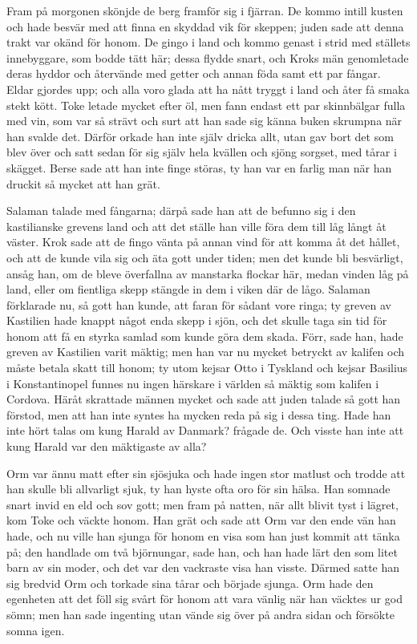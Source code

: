 \initial Fram på morgonen skönjde de berg framför sig i fjärran. De kommo intill kusten och hade besvär med att finna en skyddad vik för skeppen; juden sade att denna trakt var okänd för honom. De gingo i land och kommo genast i strid med ställets innebyggare, som bodde tätt här; dessa flydde snart, och Kroks män genomletade deras hyddor och återvände med getter och annan föda samt ett par fångar. Eldar gjordes upp; och alla voro glada att ha nått tryggt i land och åter få smaka stekt kött. Toke letade mycket efter öl, men fann endast ett par skinnbälgar fulla med vin, som var så strävt och surt att han sade sig känna buken skrumpna när han svalde det. Därför orkade han inte själv dricka allt, utan gav bort det som blev över och satt sedan för sig själv hela kvällen och sjöng sorgset, med tårar i skägget. Berse sade att han inte finge störas, ty han var en farlig man när han druckit så mycket att han grät.

\initial Salaman talade med fångarna; därpå sade han att de befunno sig i den kastilianske grevens land och att det ställe han ville föra dem till låg långt åt väster. Krok sade att de fingo vänta på annan vind för att komma åt det hållet, och att de kunde vila sig och äta gott under tiden; men det kunde bli besvärligt, ansåg han, om de bleve överfallna av manstarka flockar här, medan vinden låg på land, eller om fientliga skepp stängde in dem i viken där de lågo. Salaman förklarade nu, så gott han kunde, att faran för sådant vore ringa; ty greven av Kastilien hade knappt något enda skepp i sjön, och det skulle taga sin tid för honom att få en styrka samlad som kunde göra dem skada. Förr, sade han, hade greven av Kastilien varit mäktig; men han var nu mycket betryckt av kalifen och måste betala skatt till honom; ty utom kejsar Otto i Tyskland och kejsar Basilius i Konstantinopel funnes nu ingen härskare i världen så mäktig som kalifen i Cordova. Häråt skrattade männen mycket och sade att juden talade så gott han förstod, men att han inte syntes ha mycken reda på sig i dessa ting. Hade han inte hört talas om kung Harald av Danmark? frågade de. Och visste han inte att kung Harald var den mäktigaste av alla?

\initial Orm var ännu matt efter sin sjösjuka och hade ingen stor matlust och trodde att han skulle bli allvarligt sjuk, ty han hyste ofta oro för sin hälsa. Han somnade snart invid en eld och sov gott; men fram på natten, när allt blivit tyst i lägret, kom Toke och väckte honom. Han grät och sade att Orm var den ende vän han hade, och nu ville han sjunga för honom en visa som han just kommit att tänka på; den handlade om två björnungar, sade han, och han hade lärt den som litet barn av sin moder, och det var den vackraste visa han visste. Därmed satte han sig bredvid Orm och torkade sina tårar och började sjunga. Orm hade den egenheten att det föll sig svårt för honom att vara vänlig när han väcktes ur god sömn; men han sade ingenting utan vände sig över på andra sidan och försökte somna igen.


